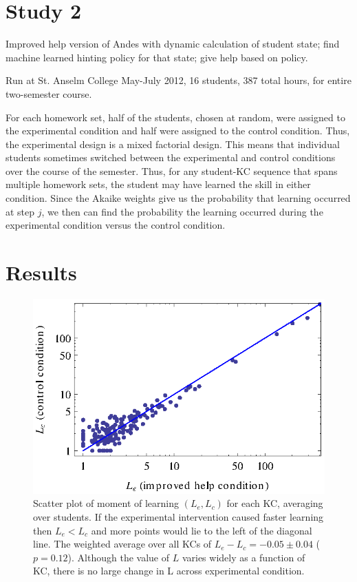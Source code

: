\documentclass{edm_template}
\begin{document}
\section{Study 2}

Improved help version of Andes with dynamic calculation of student state; find machine learned hinting policy for that state; give help based on policy.

Run at St. Anselm College May-July 2012, 16 students, 387 total hours, 
for entire two-semester course.  

For each homework set, half of the students, chosen at random, were
assigned to the experimental condition and half were assigned to
the control condition.  Thus, the experimental design is a mixed 
factorial design.
This means that individual students sometimes switched
between the experimental and control conditions over the course of the
semester.  Thus, for any student-KC sequence that spans multiple
homework sets, the student may have learned the skill in either 
condition.  Since the Akaike weights  give us the probability that 
learning occurred at step $j$, we then can find the probability 
the learning occurred
during the experimental condition versus the control condition.


\section{Results}
%
%

\begin{figure}
   \centering\includegraphics{scatter-step.eps}
   \caption{Scatter plot of moment of learning $(L_e,L_c)$ for each
     KC, averaging over students.  If the experimental intervention caused
     faster learning then $L_e<L_c$ and more points would lie to the 
     left of the diagonal line.
     The weighted average over all KCs of $L_e-L_c = -0.05\pm 0.04$ ($p=0.12$).
     Although the value of $L$ varies widely as a function of KC, there
     is no large change in L across experimental condition.
   }\label{scatterstep}
\end{figure}
\end{document}
